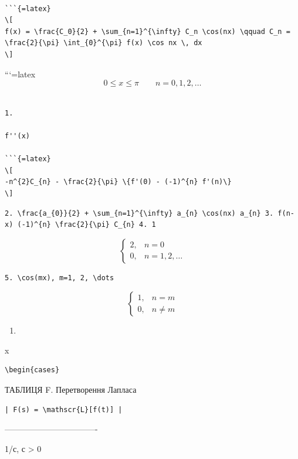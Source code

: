 \documentclass[
]{article}
\providecommand{\tightlist}{%
  \setlength{\itemsep}{0pt}\setlength{\parskip}{0pt}}
\begin{document}
\begin{verbatim}

```{=latex}
\[
f(x) = \frac{C_0}{2} + \sum_{n=1}^{\infty} C_n \cos(nx) \qquad C_n = \frac{2}{\pi} \int_{0}^{\pi} f(x) \cos nx \, dx
\]
\end{verbatim}

```{=latex}
\[
0 \le x \le \pi \qquad n = 0, 1, 2, \dots
\]

\begin{verbatim}

1.

f''(x)

```{=latex}
\[
-n^{2}C_{n} - \frac{2}{\pi} \{f'(0) - (-1)^{n} f'(n)\}
\]
\end{verbatim}

\begin{verbatim}
2. \frac{a_{0}}{2} + \sum_{n=1}^{\infty} a_{n} \cos(nx) a_{n} 3. f(n-x) (-1)^{n} \frac{2}{\pi} C_{n} 4. 1
\end{verbatim}

\[
\begin{cases} 2, &n=0 \\ 0, &n=1, 2, \dots \end{cases}
\]

\begin{verbatim}
5. \cos(mx), m=1, 2, \dots
\end{verbatim}

\[
\begin{cases} 1, & n=m \\ 0, & n\neq m \end{cases}
\]

\begin{enumerate}
\def\labelenumi{\arabic{enumi}.}
\setcounter{enumi}{5}
\tightlist
\item
\end{enumerate}

x

\begin{verbatim}
\begin{cases}
\end{verbatim}

ТАБЛИЦЯ F. Перетворення Лапласа

\begin{verbatim}
| F(s) = \mathscr{L}[f(t)] |
\end{verbatim}

\textbar----------------------------------\textbar{}

1/с, с \textgreater{} 0 \textbar{}
\end{document}
